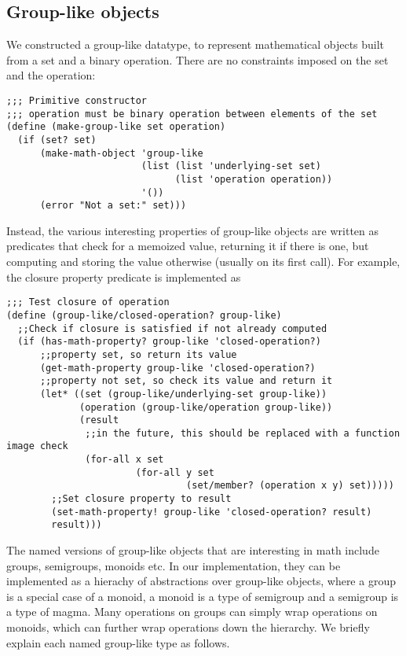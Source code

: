 \documentclass{article}
\begin{document}
        \subsection{Group-like objects}
            We constructed a group-like datatype, to represent mathematical objects built from a set and a binary operation. There are no constraints imposed on the set and the operation:
\begin{verbatim}
;;; Primitive constructor
;;; operation must be binary operation between elements of the set
(define (make-group-like set operation)
  (if (set? set)
      (make-math-object 'group-like
                        (list (list 'underlying-set set)
                              (list 'operation operation))
                        '())
      (error "Not a set:" set)))
\end{verbatim}
            Instead, the various interesting properties of group-like objects are written as predicates that check for a memoized value, returning it if there is one, but computing and storing the value otherwise (usually on its first call). For example, the closure property predicate is implemented as
\begin{verbatim}
;;; Test closure of operation
(define (group-like/closed-operation? group-like)
  ;;Check if closure is satisfied if not already computed
  (if (has-math-property? group-like 'closed-operation?)
      ;;property set, so return its value
      (get-math-property group-like 'closed-operation?)
      ;;property not set, so check its value and return it
      (let* ((set (group-like/underlying-set group-like))
             (operation (group-like/operation group-like))
             (result
              ;;in the future, this should be replaced with a function image check
              (for-all x set
                       (for-all y set
                                (set/member? (operation x y) set)))))
        ;;Set closure property to result
        (set-math-property! group-like 'closed-operation? result)
        result)))
\end{verbatim}
            
            The named versions of group-like objects that are interesting in math include groups, semigroups, monoids etc. In our implementation, they can be implemented as a hierachy of abstractions over group-like objects, where a group is a special case of a monoid, a monoid is a type of semigroup and a semigroup is a type of magma. Many operations on groups can simply wrap operations on monoids, which can further wrap operations down the hierarchy. We briefly explain each named group-like type as follows.
\end{document}
